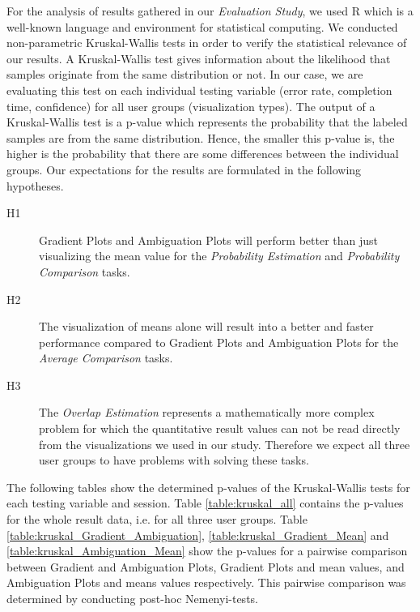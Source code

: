 For the analysis of results gathered in our \textit{Evaluation Study}, we used R \cite{REnvironment} which is a well-known language and environment for statistical computing. We conducted non-parametric Kruskal-Wallis tests \cite{kruskal1952use} in order to verify the statistical relevance of our results. A Kruskal-Wallis test gives information about the likelihood that samples originate from the same distribution or not. In our case, we are evaluating this test on each individual testing variable (error rate, completion time, confidence) for all user groups (visualization types). The output of a Kruskal-Wallis test is a p-value which represents the probability that the labeled samples are from the same distribution. Hence, the smaller this p-value is, the higher is the probability that there are some differences between the individual groups. Our expectations for the results are formulated in the following hypotheses.

\begin{description}
\item[H1] Gradient Plots and Ambiguation Plots will perform better than just visualizing the mean value for the \textit{Probability Estimation} and \textit{Probability Comparison} tasks.
\item[H2] The visualization of means alone will result into a better and faster performance compared to Gradient Plots and Ambiguation Plots for the \textit{Average Comparison} tasks.
\item[H3] The \textit{Overlap Estimation} represents a mathematically more complex problem for which the quantitative result values can not be read directly from the visualizations we used in our study. Therefore we expect all three user groups to have problems with solving these tasks.
\end{description}

The following tables show the determined p-values of the Kruskal-Wallis tests for each testing variable and session. Table \ref{table:kruskal_all} contains the p-values for the whole result data, i.e. for all three user groups. Table \ref{table:kruskal_Gradient_Ambiguation}, \ref{table:kruskal_Gradient_Mean} and \ref{table:kruskal_Ambiguation_Mean} show the p-values for a pairwise comparison between Gradient and Ambiguation Plots, Gradient Plots and mean values, and Ambiguation Plots and means values respectively. This pairwise comparison was determined by conducting post-hoc Nemenyi-tests.


